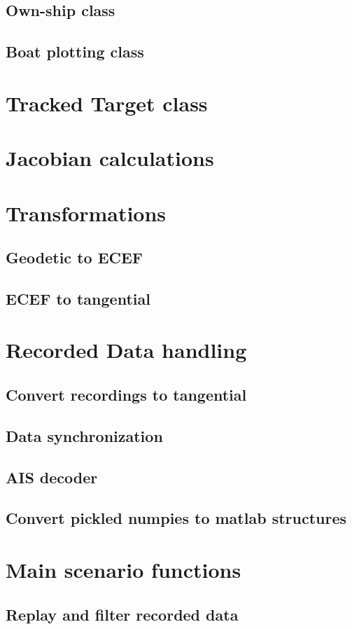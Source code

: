 \subsection{Own-ship class}

\subsection{Boat plotting class}

\section{Tracked Target class}


\section{Jacobian calculations}

\section{Transformations}
\subsection{Geodetic to ECEF}

\subsection{ECEF to tangential}


\section{Recorded Data handling}
\subsection{Convert recordings to tangential}

\subsection{Data synchronization}

\subsection{AIS decoder}

\subsection{Convert pickled numpies to matlab structures}


\section{Main scenario functions}
\subsection{Replay and filter recorded data}
